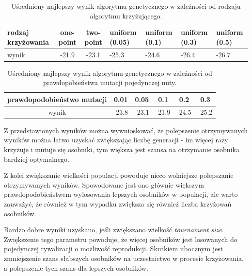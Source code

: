 \documentclass{article}
\begin{document}
\begin{table}
\begin{center}
  \begin{tabular}{ | p{1.4cm} || c | c | p{1.4cm}  | p{1.4cm}   | p{1.4cm}  | p{1.4cm}  | }
    \hline
	rodzaj krzyżowania & one-point & two-point & uniform (0.05) & uniform (0.1) & uniform (0.3) & uniform (0.5) \\ \hline
	wynik & -21.9 & -23.1 & -25.3 & -24.6 & -26.4 & -26.7 \\ \hline 
  \end{tabular}
  \caption{Uśredniony najlepszy wynik algorytmu genetycznego w zależności od rodzaju algorytmu krzyżującego.}
  \label{tab:wynik_a_crossover}
  \end{center}
\end{table}

\begin{table}
\begin{center}
  \begin{tabular}{ | c || c | c | c | c | c | }
    \hline
	prawdopodobieństwo mutacji & 0.01 & 0.05 & 0.1 & 0.2 & 0.3 \\ \hline
	wynik & -23.8 & -23.1 & -21.9 & -24.5 & -25.2 \\ \hline 
  \end{tabular}
  \caption{Uśredniony najlepszy wynik algorytmu genetycznego w zależności od prawdopobieństwa mutacji pojedynczej nuty.}
  \label{tab:wynik_a_mutacja}
  \end{center}
\end{table}

Z przedstawionych wyników można wywnioskować, że polepszenie otrzymywanych wyników można łatwo uzyskać zwiększając liczbę generacji - im więcej razy krzyżuje i mutuje się osobniki, tym większa jest szansa na otrzymanie osobnika bardziej optymalnego.

Z kolei zwiększanie wielkości populacji powoduje nieco wolniejsze polepszanie otrzymywanych wyników. Spowodowane jest ono głównie większym prawdopodobieństwem wylosowania lepszych osobników w populacji, ale warto zauważyć, że również w tym wypadku zwiększa się również liczba krzyżowań osobników.

Bardzo dobre wyniki uzyskano, jeśli zwiększano wielkość \emph{tournament size}. Zwiększenie tego parametru powoduje, że więcej osobników jest losowanych do pojedynczej rywalizacji o możliwość reprodukcji. Skutkiem ubocznym jest zmniejszenie szans słabszych osobników na uczestnictwo w procesie krzyżowania, a polepszenie tych szans dla lepszych osobników.
\end{document}
